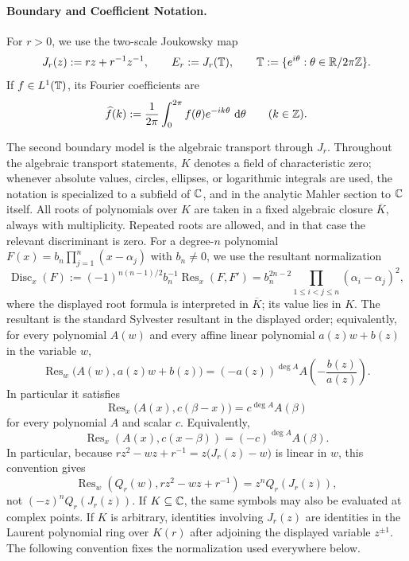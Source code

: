 \paragraph{Boundary and Coefficient Notation.}
For \(r>0\), we use the two-scale Joukowsky map
\[
J_r(z):=rz+r^{-1}z^{-1},
\qquad
E_r:=J_r(\mathbb{T}),
\qquad
\mathbb{T}:=\{e^{i\theta}:\theta\in\mathbb{R}/2\pi\mathbb{Z}\}.
\]
If \(f\in L^1(\mathbb{T})\), its Fourier coefficients are
\[
\widehat f(k):=\frac{1}{2\pi}\int_{0}^{2\pi} f(\theta)e^{-ik\theta}\,\,\mathrm{d}\theta
\qquad (k\in\mathbb{Z}).
\]

The second boundary model is the algebraic transport through \(J_r\). Throughout the algebraic transport statements, \(K\) denotes a field of characteristic zero; whenever absolute values, circles, ellipses, or logarithmic integrals are used, the notation is specialized to a subfield of \(\mathbb{C}\), and in the analytic Mahler section to \(\mathbb{C}\) itself.  All roots of polynomials over \(K\) are taken in a fixed algebraic closure \(\overline K\), always with multiplicity.  Repeated roots are allowed, and in that case the relevant discriminant is zero.  For a degree-\(n\) polynomial \(F(x)=b_n\prod_{j=1}^n(x-\alpha_j)\) with \(b_n\ne0\), we use the resultant normalization
\[
\operatorname{Disc}_x(F):=(-1)^{n(n-1)/2}b_n^{-1}\operatorname{Res}_x(F,F')
=b_n^{2n-2}\prod_{1\le i<j\le n}(\alpha_i-\alpha_j)^2,
\]
where the displayed root formula is interpreted in \(\overline K\); its value lies in \(K\).  The resultant is the standard Sylvester resultant in the displayed order; equivalently, for every polynomial \(A(w)\) and every affine linear polynomial \(a(z)w+b(z)\) in the variable \(w\),
\[
\operatorname{Res}_w\bigl(A(w),a(z)w+b(z)\bigr)=(-a(z))^{\deg A}A\!\left(-\frac{b(z)}{a(z)}\right).
\]
In particular it satisfies
\[
\operatorname{Res}_x\bigl(A(x),c(\beta-x)\bigr)=c^{\deg A}A(\beta)
\]
for every polynomial \(A\) and scalar \(c\).  Equivalently,
\[
\operatorname{Res}_x(A(x),c(x-\beta))=(-c)^{\deg A}A(\beta).
\]
In particular, because \(r z^2-wz+r^{-1}=z\bigl(J_r(z)-w\bigr)\) is linear in \(w\), this convention gives
\[
\operatorname{Res}_w(Q_r(w),rz^2-wz+r^{-1})=z^nQ_r(J_r(z)),
\]
not \((-z)^nQ_r(J_r(z))\).  If \(K\subseteq\mathbb{C}\), the same symbols may also be evaluated at complex points.  If \(K\) is arbitrary, identities involving \(J_r(z)\) are identities in the Laurent polynomial ring over \(K(r)\) after adjoining the displayed variable \(z^{\pm1}\).  The following convention fixes the normalization used everywhere below.

